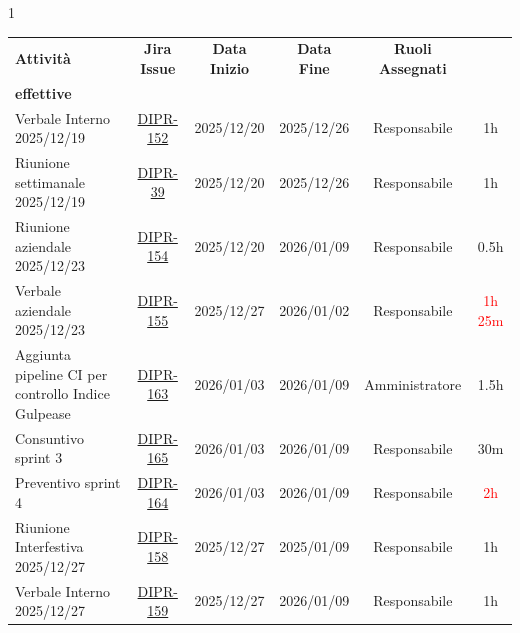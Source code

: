 \documentclass[a4paper,12pt]{article}
\begin{document}
    \small
    \begin{spacing}{1}
        \begin{longtable}{|p{4cm}|c|c|c|c|c|}
            \hline
            \rowcolor{zpusgreen!30}
            \textbf{Attività} & \textbf{Jira Issue} & \textbf{Data Inizio} & \textbf{Data Fine} & \textbf{Ruoli Assegnati} & \begin{tabular}[c]{@{}c@{}} \textbf{Ore} \\ \textbf{effettive} \end{tabular} \\
            \hline
            Verbale Interno 2025/12/19 & \href{https://7zpus.atlassian.net/browse/DIPR-152}{DIPR-152}& 2025/12/20 & 2025/12/26 & Responsabile & 1h \\
            \hline
            Riunione settimanale 2025/12/19 & \href{https://7zpus.atlassian.net/browse/DIPR-39}{DIPR-39} & 2025/12/20 & 2025/12/26 & Responsabile & 1h \\
            \hline
            Riunione aziendale 2025/12/23 & \href{https://7zpus.atlassian.net/browse/DIPR-154}{DIPR-154} & 2025/12/20 & 2026/01/09 & Responsabile & 0.5h \\
            \hline
            Verbale aziendale 2025/12/23 & \href{https://7zpus.atlassian.net/browse/DIPR-155}{DIPR-155}  & 2025/12/27 & 2026/01/02 & Responsabile & \textcolor{red}{1h 25m} \\
            \hline
            Aggiunta pipeline CI per controllo Indice Gulpease & \href{https://7zpus.atlassian.net/browse/DIPR-163}{DIPR-163} & 2026/01/03 & 2026/01/09 & Amministratore & 1.5h \\
            \hline
            Consuntivo sprint 3 & \href{https://7zpus.atlassian.net/browse/DIPR-165}{DIPR-165} & 2026/01/03 & 2026/01/09 & Responsabile & \textcolor{green!50!black}{30m} \\
            \hline
            Preventivo sprint 4 & \href{https://7zpus.atlassian.net/browse/DIPR-164}{DIPR-164} & 2026/01/03 & 2026/01/09 & Responsabile & \textcolor{red}{2h}\\
            \hline
            Riunione Interfestiva 2025/12/27 & \href{https://7zpus.atlassian.net/browse/DIPR-158}{DIPR-158} & 2025/12/27 & 2025/01/09 & Responsabile & 1h \\
            \hline
            Verbale Interno 2025/12/27 & \href{https://7zpus.atlassian.net/browse/DIPR-159}{DIPR-159} & 2025/12/27 & 2026/01/09 & Responsabile & 1h \\

\end{longtable}
\end{spacing}
\end{document}
